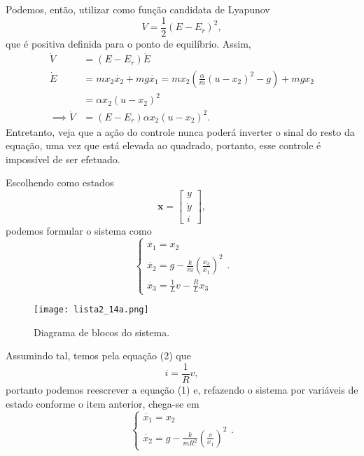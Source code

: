 \documentclass[a4paper]{report}
\begin{document}
Podemos, então, utilizar como função candidata de Lyapunov \[
V = \frac{1}{2}\left( E-E_r \right)^2 
,\] que é positiva definida para o ponto de equilíbrio. Assim,
\begin{align*}
    \dot{V} &= \left( E-E_r \right) \dot{E} \\
    \dot{E} &= mx_2\dot{x_2} +mg \dot{x_1} = mx_2\left( \frac{\alpha}{m}\left( u-x_2 \right)^2 -g \right) + mgx_2 \\
    &= \alpha x_2 \left( u-x_2 \right)^2 \\
    \implies \dot{V} &= (E-E_r)\alpha x_2 \left( u-x_2 \right)^2
.\end{align*}
Entretanto, veja que a ação do controle nunca poderá inverter o sinal do resto da equação, uma vez que está elevada ao quadrado, portanto, esse controle é impossível de ser efetuado.



Escolhendo como estados \[
\bm{x} = \begin{bmatrix} y \\ \dot{y} \\ i \end{bmatrix} 
,\] podemos formular o sistema como \[
\begin{cases}
    \dot{x_1}= x_2 \\
    \dot{x_2} = g - \frac{k}{m}\left( \frac{x_3}{x_1} \right) ^2 \\
    \dot{x_3} = \frac{1}{L}v - \frac{R}{L}x_3
\end{cases}
.\] 

\begin{figure}[H]
    \centering
    \texttt{[image: lista2\_14a.png]}
    \caption{Diagrama de blocos do sistema.}
    \label{fig:lista2_11a-png}
\end{figure}


Assumindo tal, temos pela equação (2) que \[
i = \frac{1}{R}v
,\] portanto podemos reescrever a equação (1) e, refazendo o sistema por variáveis de estado conforme o item anterior, chega-se em \[
\begin{cases}
    \dot{x_1} = x_2 \\
    \dot{x_2} = g - \frac{k}{mR^2}\left( \frac{v}{x_1} \right)^2
\end{cases}
.\] 

\end{document}
